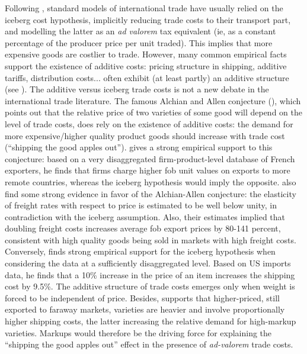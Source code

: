 \documentclass[a4paper,11pt]{article}
\begin{document}
Following \citet{samuelson1954}, standard models of international trade have usually relied on the iceberg cost hypothesis, implicitly reducing trade costs to their transport part, and modelling the latter as an \emph{ad valorem} tax equivalent (ie, as a constant percentage of the producer price per unit traded). This implies that more expensive goods are costlier to trade. However, many common empirical facts support the existence of additive costs: pricing structure in shipping, additive tariffs, distribution costs... often exhibit (at least partly) an additive structure (see \citealp{Irrazabal_2015}). The additive versus iceberg trade costs is not a new debate in the international trade literature. The famous Alchian and Allen conjecture (\citealp{alchian}), which points out that the relative price of two varieties of some good will depend on the level of trade costs, does rely on the existence of additive costs: the demand for more expensive/higher quality product goods should increase with trade cost (``shipping the good apples out''). \citet{martin2012} gives a strong empirical support to this conjecture: based on a very disaggregated firm-product-level database of French exporters, he finds that firms charge higher fob unit values on exports to more remote countries, whereas the iceberg hypothesis would imply the opposite. \citet{hummels_skiba} also find some strong evidence in favor of the Alchian-Allen conjecture: the elasticity of freight rates with respect to price is estimated to be well below unity, in contradiction with the iceberg assumption. Also, their estimates implied that doubling freight costs increases average fob export prices by 80-141 percent, consistent with high quality goods being sold in markets with high freight costs. Conversely, \citet{Lashka15} finds strong empirical support for the iceberg hypothesis when considering the data at a sufficiently disaggregated level. Based on US imports data, he finds that a 10\% increase in the price of an item increases the shipping cost by 9.5\%. The additive structure of trade costs emerges only when weight is forced to be independent of price. Besides, \citet{Lashka15} supports that higher-priced, still exported to faraway markets, varieties are heavier and involve proportionally higher shipping costs, the latter increasing the relative demand for high-markup varieties. Markups would therefore be the driving force for explaining the ``shipping the good apples out'' effect in the presence of \emph{ad-valorem} trade costs.
\end{document}
